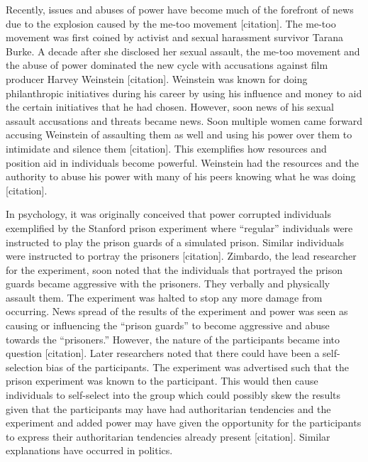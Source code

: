 \documentclass[
  donotrepeattitle,doc, 12pt, a4paper,floatsintext]{apa7}
\begin{document}
Recently, issues and abuses of power have become much of the forefront of news due to the explosion caused by the me-too movement {[}citation{]}. The me-too movement was first coined by activist and sexual harassment survivor Tarana Burke. A decade after she disclosed her sexual assault, the me-too movement and the abuse of power dominated the new cycle with accusations against film producer Harvey Weinstein {[}citation{]}. Weinstein was known for doing philanthropic initiatives during his career by using his influence and money to aid the certain initiatives that he had chosen. However, soon news of his sexual assault accusations and threats became news. Soon multiple women came forward accusing Weinstein of assaulting them as well and using his power over them to intimidate and silence them {[}citation{]}. This exemplifies how resources and position aid in individuals become powerful. Weinstein had the resources and the authority to abuse his power with many of his peers knowing what he was doing {[}citation{]}.

In psychology, it was originally conceived that power corrupted individuals exemplified by the Stanford prison experiment where ``regular'' individuals were instructed to play the prison guards of a simulated prison. Similar individuals were instructed to portray the prisoners {[}citation{]}. Zimbardo, the lead researcher for the experiment, soon noted that the individuals that portrayed the prison guards became aggressive with the prisoners. They verbally and physically assault them. The experiment was halted to stop any more damage from occurring. News spread of the results of the experiment and power was seen as causing or influencing the ``prison guards'' to become aggressive and abuse towards the ``prisoners.'' However, the nature of the participants became into question {[}citation{]}. Later researchers noted that there could have been a self-selection bias of the participants. The experiment was advertised such that the prison experiment was known to the participant. This would then cause individuals to self-select into the group which could possibly skew the results given that the participants may have had authoritarian tendencies and the experiment and added power may have given the opportunity for the participants to express their authoritarian tendencies already present {[}citation{]}. Similar explanations have occurred in politics.
\end{document}
